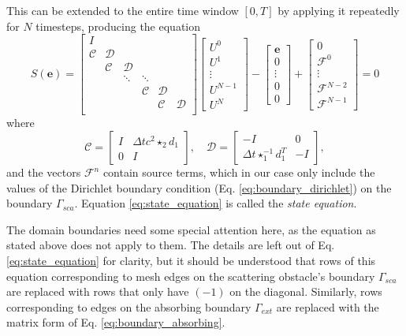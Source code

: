 \documentclass[utf8,english]{gradu3}
\begin{document}
This can be extended to the entire time window $[0,T]$
by applying it repeatedly for $N$ timesteps, producing the equation
\begin{equation}\label{eq:state_equation}
  S(\mathbf{e}) =
  \begin{bmatrix}
  I \\
  \mathcal{C} & \mathcal{D} \\
  & \mathcal{C} & \mathcal{D} \\
  & & \ddots & \ddots \\
  & & & \mathcal{C} & \mathcal{D} \\
  & & & & \mathcal{C} & \mathcal{D} \\
  \end{bmatrix}
  \begin{bmatrix}
  U^0 \\ U^1 \\ \vdots \\ U^{N-1} \\ U^N
  \end{bmatrix}
  - \begin{bmatrix}
  \mathbf{e} \\ 0 \\ \vdots \\ 0 \\ 0
  \end{bmatrix}
  + \begin{bmatrix}
  0 \\ \mathcal{F}^0 \\ \vdots \\ \mathcal{F}^{N-2} \\ \mathcal{F}^{N-1}
  \end{bmatrix}
  = 0
\end{equation}
where
\[
  \mathcal{C} = \begin{bmatrix}
  I & \Delta t c^2 \star_2 d_1 \\
  0 & I
  \end{bmatrix},
  \quad
  \mathcal{D} = \begin{bmatrix}
  -I & 0 \\
  \Delta t \star_1^{-1} d_1^T & -I
  \end{bmatrix},
\]
and the vectors $\mathcal{F}^n$ contain source terms,
which in our case only include the values of the Dirichlet boundary condition
(Eq. \eqref{eq:boundary_dirichlet}) on the boundary $\Gamma_{sca}$.
Equation \eqref{eq:state_equation} is called the \textit{state equation}.

The domain boundaries need some special attention here,
as the equation as stated above does not apply to them.
The details are left out of Eq. \eqref{eq:state_equation} for clarity,
but it should be understood that rows of this equation
corresponding to mesh edges on the scattering obstacle's boundary $\Gamma_{sca}$
are replaced with rows that only have $(-1)$ on the diagonal.
Similarly, rows corresponding to edges on the absorbing boundary $\Gamma_{ext}$
are replaced with the matrix form of Eq. \eqref{eq:boundary_absorbing}.
\end{document}
